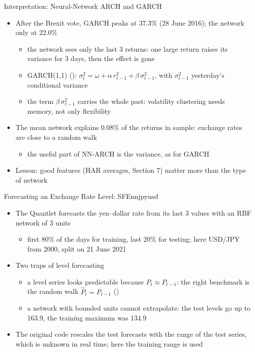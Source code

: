 \begin{frame}{Interpretation: Neural-Network ARCH and GARCH}
\itemsize{\small}
\begin{itemize}
    \item After the Brexit vote, GARCH peaks at 37.3\% (28 June 2016); the network only at 22.0\%
    \begin{itemize}
        \item the network sees only the last 3 returns: one large return raises its variance for 3 days, then the effect is gone
        \item GARCH(1,1) (): $\sigma_t^2 = \omega + \alpha\,r_{t-1}^2 + \beta\,\sigma_{t-1}^2$, with $\sigma_{t-1}^2$ yesterday's conditional variance
        \item the term $\beta\,\sigma_{t-1}^2$ carries the whole past: volatility clustering needs memory, not only flexibility
    \end{itemize}
    \item The mean network explains $0.08\%$ of the returns in sample: exchange rates are close to a random walk
    \begin{itemize}
        \item the useful part of NN-ARCH is the variance, as for GARCH
    \end{itemize}
    \item Lesson: good features (HAR averages, Section 7) matter more than the type of network
\end{itemize}
\end{frame}

\begin{frame}{Forecasting an Exchange Rate Level: SFEnnjpyusd}
\itemsize{\small}
\begin{itemize}
    \item The Quantlet  forecasts the yen--dollar rate from its last 3 values with an RBF network of 3 units
    \begin{itemize}
        \item first 80\% of the days for training, last 20\% for testing; here USD/JPY from 2000, split on 21 June 2021
    \end{itemize}
    \item Two traps of level forecasting
    \begin{itemize}
        \item a level series looks predictable because $P_t \approx P_{t-1}$: the right benchmark is the random walk $\hat P_t = P_{t-1}$ ()
        \item a network with bounded units cannot extrapolate: the test levels go up to 163.9, the training maximum was 134.9
    \end{itemize}
    \item The original code rescales the test forecasts with the range of the test series, which is unknown in real time; here the training range is used
\end{itemize}
\end{frame}

